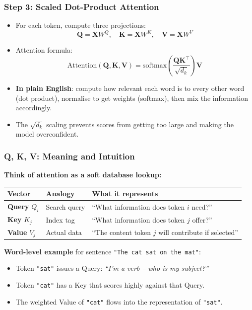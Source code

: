 \begin{frame}[fragile]\frametitle{Step 3: Scaled Dot-Product Attention}
\begin{itemize}
\item For each token, compute three projections:
\[
  \mathbf{Q} = \mathbf{X}W^Q, \quad \mathbf{K} = \mathbf{X}W^K, \quad \mathbf{V} = \mathbf{X}W^V
\]
\item Attention formula:
\[
  \text{Attention}(\mathbf{Q}, \mathbf{K}, \mathbf{V}) 
    = \text{softmax}\!\left(\frac{\mathbf{Q}\mathbf{K}^\top}{\sqrt{d_k}}\right)\mathbf{V}
\]
\item \textbf{In plain English}: compute how relevant each word is to every other word (dot product), normalise to get weights (softmax), then mix the information accordingly.
\item The $\sqrt{d_k}$ scaling prevents scores from getting too large and making the model overconfident.
\end{itemize}
\end{frame}

\begin{frame}[fragile]\frametitle{Q, K, V: Meaning and Intuition}
\textbf{Think of attention as a soft database lookup:}
\begin{center}
\small
\renewcommand{\arraystretch}{1.3}
\begin{tabular}{|l|l|p{5.5cm}|}
\hline
\textbf{Vector} & \textbf{Analogy} & \textbf{What it represents} \\
\hline
\textbf{Query} $Q_i$ & Search query & ``What information does token $i$ need?'' \\
\hline
\textbf{Key}   $K_j$ & Index tag    & ``What information does token $j$ offer?'' \\
\hline
\textbf{Value} $V_j$ & Actual data  & ``The content token $j$ will contribute if selected'' \\
\hline
\end{tabular}
\end{center}
\vspace{0.3em}
\textbf{Word-level example} for sentence \texttt{"The cat sat on the mat"}:
\begin{itemize}
\item Token \texttt{"sat"} issues a Query: \textit{``I'm a verb – who is my subject?''}
\item Token \texttt{"cat"} has a Key that scores highly against that Query.
\item The weighted Value of \texttt{"cat"} flows into the representation of \texttt{"sat"}.
\end{itemize}
\end{frame}

